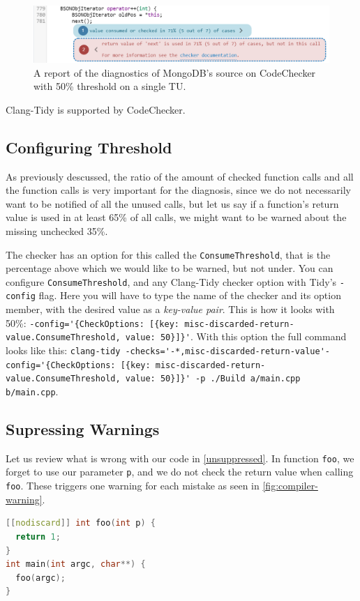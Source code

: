 \begin{figure}[H]
	\includegraphics[width=\linewidth]{images/codechecker_first_ss_mongo_single_50.png}
	\caption{A report of the diagnostics of MongoDB's source on CodeChecker with 50\% threshold on a single TU.}
	\label{fig:mongo50single}
\end{figure}

Clang-Tidy is supported by CodeChecker.~\cite{codechecker}

\subsection{Configuring Threshold}

As previously descussed, the ratio of the amount of checked function calls and all the function calls is very important for the
diagnosis, since we do not necessarily want to be notified of all the unused calls, but let us say if a function's return value
is used in at least 65\% of all calls, we might want to be warned about the missing unchecked 35\%.

The checker has an option for this called the \texttt{ConsumeThreshold}, that is the percentage above which we would like to be warned,
but not under.
You can configure \texttt{ConsumeThreshold}, and any Clang-Tidy checker option with Tidy's \lstinline{-config} flag. Here you will have to type
the name of the checker and its option member, with the desired value as a \emph{key-value pair}. This is how it looks with 50\%:
\lstinline!-config='{CheckOptions: [{key: misc-discarded-return-value.ConsumeThreshold, value: 50}]}'!. With this option the full
command looks like this:
\lstinline!clang-tidy -checks='-*,misc-discarded-return-value'-config='{CheckOptions: [{key: misc-discarded-return-value.ConsumeThreshold, value: 50}]}' -p ./Build a/main.cpp b/main.cpp!.

\subsection{Supressing Warnings}

Let us review what is wrong with our code in \cref{unsuppressed}. In function \texttt{foo}, we forget to use our parameter \texttt{p}, and we do not
check the return value when calling \texttt{foo}. These triggers one warning for each mistake as seen in \cref{fig:compiler-warning}.
\begin{lstlisting}[language={C++},caption={An example of both unused parameter and ignored return value with nodiscard.},label={unsuppressed}]
[[nodiscard]] int foo(int p) {
  return 1;
}
int main(int argc, char**) {
  foo(argc);
}
\end{lstlisting}

